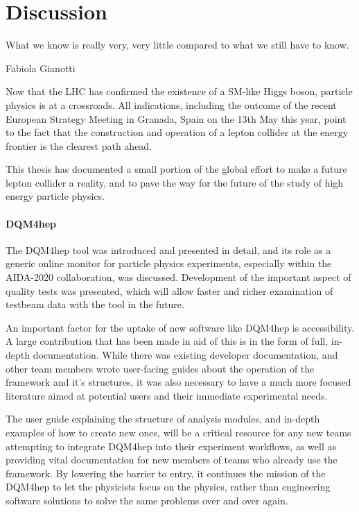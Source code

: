 \chapter{Discussion}
\label{chapter:discussion}

\epigraph{What we know is really very, very little compared to what we still have to know.}{Fabiola Gianotti}

Now that the \acrlong{LHC} has confirmed the existence of a \acrlong{SM}-like Higgs boson, particle physics is at a crossroads. All indications, including the outcome of the recent European Strategy Meeting in Granada, Spain on the 13th May this year, point to the fact that the construction and operation of a lepton collider at the energy frontier is the clearest path ahead. 

This thesis has documented a small portion of the global effort to make a future lepton collider a reality, and to pave the way for the future of the study of high energy particle physics.

\subsubsection*{DQM4hep}
The \acrfull{DQM4hep} tool was introduced and presented in detail, and its role as a generic online monitor for particle physics experiments, especially within the AIDA-2020 collaboration, was discussed. Development of the important aspect of quality tests was presented, which will allow faster and richer examination of testbeam data with the tool in the future.

An important factor for the uptake of new software like \acrshort{DQM4hep} is accessibility. A large contribution that has been made in aid of this is in the form of full, in-depth documentation. While there was existing developer documentation, and other team members wrote user-facing guides about the operation of the framework and it's structures, it was also necessary to have a much more focused literature aimed at potential users and their immediate experimental needs.

The user guide explaining the structure of analysis modules, and in-depth examples of how to create new ones, will be a critical resource for any new teams attempting to integrate \acrshort{DQM4hep} into their experiment workflows, as well as providing vital documentation for new members of teams who already use the framework. By lowering the barrier to entry, it continues the mission of the \acrshort{DQM4hep} to let the physicists focus on the physics, rather than engineering software solutions to solve the same problems over and over again.

